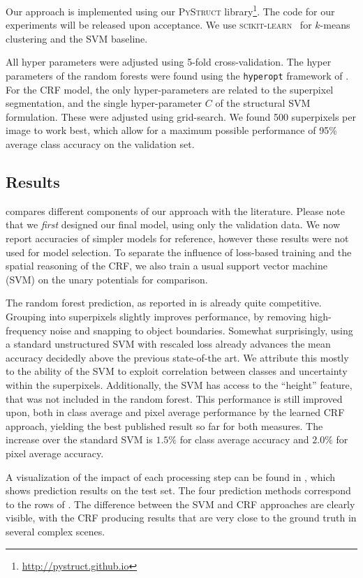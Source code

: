 \documentclass[a4paper, 10pt, conference]{ieeeconf}      %
\begin{document}
Our approach is implemented using our \textsc{PyStruct}
library\footnote{\url{http://pystruct.github.io}}.  The code for our
experiments will be released upon acceptance. We use \textsc{scikit-learn}~\citep{pedregosa2011scikit}
for $k$-means clustering and the SVM baseline.

All hyper parameters were adjusted using 5-fold cross-validation. The
hyper parameters of the random forests were found using the \texttt{hyperopt}
framework of \cite{bergstra2011algorithms}. For the CRF model, the only
hyper-parameters are related to the superpixel segmentation, and the single
hyper-parameter $C$ of the structural SVM formulation. These were adjusted
using grid-search.
We found 500 superpixels per image to work best, which allow for a maximum
possible performance of 95\% average class accuracy on the validation set.

\subsection{Results}
 compares different components of our approach with the literature.
Please note that we \emph{first} designed our final model, using only the
validation data. We now report accuracies of simpler models for reference,
however these results were not used for model selection. To separate
the influence of loss-based training and the spatial reasoning of the CRF,
we also train a usual support vector machine (SVM) on the unary potentials for comparison.

The random forest prediction, as reported in \citet{stueckler2013} is already quite competitive.
Grouping into superpixels slightly improves performance, by removing
high-frequency noise and snapping to object boundaries. Somewhat surprisingly,
using a standard unstructured SVM with rescaled loss already advances the mean
accuracy decidedly above the previous state-of-the art. We
attribute this mostly to the ability of the SVM to exploit correlation between
classes and uncertainty within the superpixels.
Additionally, the SVM has access to the ``height'' feature, that was not
included in the random forest.
This performance is still improved upon, both in class average and pixel
average performance by the learned CRF approach, yielding
the best published result so far for both measures. The increase over the
standard SVM is $1.5\%$ for class average accuracy and $2.0\%$ for pixel
average accuracy.

A visualization of the impact of each processing step can be found in
, which shows prediction results on the test set.  The four
prediction methods correspond to the rows of .  The difference
between the SVM and CRF approaches are clearly visible, with the CRF producing
results that are very close to the ground truth in several complex scenes.
\end{document}
